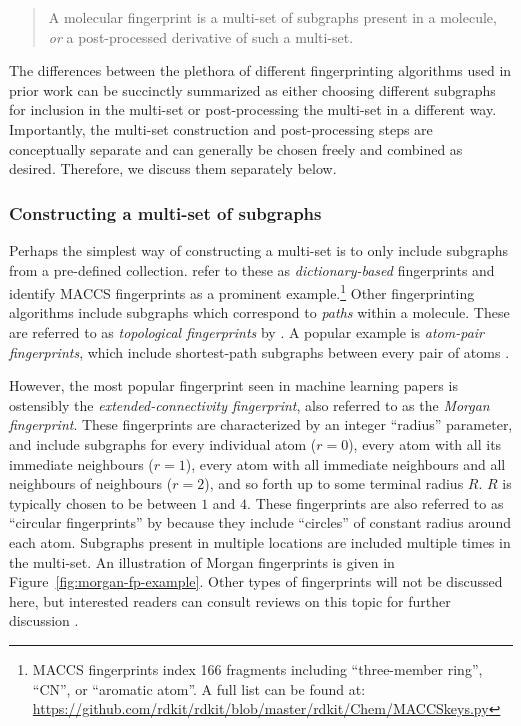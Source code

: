 \begin{quotation}
    A molecular fingerprint is a multi-set of subgraphs present in a molecule,
    \emph{or} a post-processed derivative of such a multi-set.
\end{quotation}

The differences between the plethora of different fingerprinting algorithms used in prior work
can be succinctly summarized as either choosing different subgraphs for inclusion in the multi-set
or post-processing the multi-set in a different way.
Importantly, the multi-set construction and post-processing steps are conceptually separate
and can generally be chosen freely and combined as desired.
Therefore, we discuss them separately below.

\subsubsection{Constructing a multi-set of subgraphs}

Perhaps the simplest way of constructing a multi-set is to only include subgraphs from a pre-defined collection.
\citet{yang2022concepts-fingerprint}
refer to these as \emph{dictionary-based} fingerprints and
identify MACCS fingerprints as a prominent example.\footnote{
    MACCS fingerprints index 166 fragments including ``three-member ring'', ``CN'', or ``aromatic atom''.
    A full list can be found at: \url{https://github.com/rdkit/rdkit/blob/master/rdkit/Chem/MACCSkeys.py}
}
Other fingerprinting algorithms include subgraphs which correspond to \emph{paths} within a molecule.
These are referred to as \emph{topological fingerprints} by \citet{yang2022concepts-fingerprint}.
A popular example is \emph{atom-pair fingerprints}, which include shortest-path subgraphs between every pair of atoms
\citep{carhart1985atom}.

However, the most popular fingerprint seen in machine learning papers is ostensibly the \emph{extended-connectivity fingerprint},
also referred to as the \emph{Morgan fingerprint}.
\label{definition:morgan-fingerprint}
These fingerprints are characterized by an integer ``radius'' parameter,
and include subgraphs for every individual atom ($r=0$),
every atom with all its immediate neighbours ($r=1$), every atom with all immediate neighbours and all neighbours of neighbours ($r=2$), and so forth
up to some terminal radius $R$.
$R$ is typically chosen to be between $1$ and $4$.
These fingerprints are also referred to as ``circular fingerprints'' by \citet{yang2022concepts-fingerprint}
because they include ``circles'' of constant radius around each atom.
Subgraphs present in multiple locations are included multiple times in the multi-set.
An illustration of Morgan fingerprints is given in Figure~\ref{fig:morgan-fp-example}.
Other types of fingerprints will not be discussed here,
but interested readers can consult reviews on this topic for further discussion
\citep{cereto2015molecular,yang2022concepts-fingerprint}.

